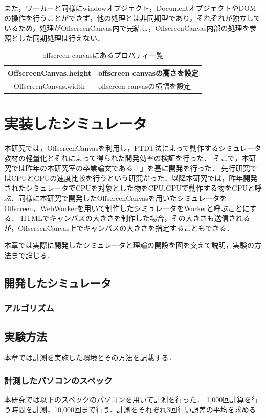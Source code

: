 \documentclass[a4j,12pt]{jsarticle}
\begin{document}
また，ワーカーと同様にwindowオブジェクト，DocumentオブジェクトやDOMの操作を行うことができず，他の処理とは非同期型であり，それぞれが独立しているため，処理がOffscreenCanvas内で完結し，OffscreenCanvas内部の処理を参照とした同期処理は行えない．

\begin{table} [h]
\centering
\caption{offscreen canvasにあるプロパティ一覧}
	\begin{tabular} {| c | l |} \hline
	OffscreenCanvas.height & offscreen canvasの高さを設定 \\ \hline
	OffscreenCanvas.width & offscreen canvasの横幅を設定 \\ \hline
	\end{tabular} 
	\label{tab:EC2018}
\end{table}
\newpage
\section{実装したシミュレータ}
本研究では，OffscreenCanvasを利用し，FTDT法によって動作するシミュレータ教材の軽量化とそれによって得られた開発効率の検証を行った．
そこで，本研究では昨年の本研究室の卒業論文である「」を基に開発を行った．
先行研究ではCPUとGPUの速度比較を行うという研究だった．以降本研究では，昨年開発されたシミュレータでCPUを対象とした物をCPU,GPUで動作する物をGPUと呼ぶ．同様に本研究で開発したOffscreenCanvasを用いたシミュレータをOffscreen，WebWorkerを用いて制作したシミュレータをWorkerと呼ぶことにする．
HTMLでキャンバスの大きさを制作した場合，その大きさも送信されるが，OffscreenCanvas上でキャンバスの大きさを指定することもできる．

本章では実際に開発したシミュレータと理論の開設を図を交えて説明，実験の方法まで論じる．
\subsection{開発したシミュレータ}
\subsubsection{アルゴリズム}
\subsection{実験方法}
本章では計測を実施した環境とその方法を記載する．
\subsubsection{計測したパソコンのスペック}
本研究では以下のスペックのパソコンを用いて計測を行った．
1,000回計算を行う時間を計測，10,000回まで行う．計測をそれぞれ3回行い誤差の平均を求める
\end{document}
